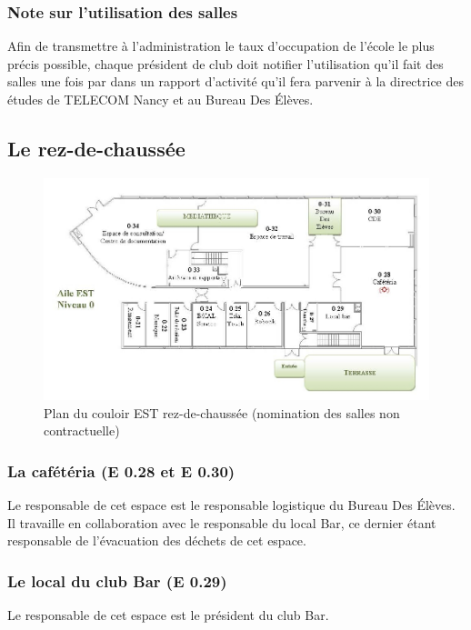 \documentclass{article} %
\begin{document}
			\subsubsection{Note sur l’utilisation des salles}

				Afin de transmettre à l’administration le taux d’occupation de
				l’école le plus précis possible, chaque président de club doit
				notifier l’utilisation qu’il fait des salles une fois par dans
				un rapport d'activité qu'il fera parvenir  à la directrice des
				études de TELECOM Nancy et au Bureau Des Élèves.

		\subsection{Le rez-de-chaussée}
		
		\begin{figure}[]
			\centering
			\includegraphics[width=0.8\linewidth]{images/aile_est}
			\caption{Plan du couloir EST rez-de-chaussée (nomination des salles
			non contractuelle)}
			\label{fig:plan}
		\end{figure}

			\subsubsection{La cafétéria (E 0.28 et E 0.30)}

				Le responsable de cet espace est le responsable logistique du
				Bureau Des Élèves. Il travaille en collaboration avec le
				responsable du local Bar, ce dernier étant responsable de
				l’évacuation des déchets de cet espace.

			\subsubsection{Le local du club Bar (E 0.29)}

				Le responsable de cet espace est le président du club Bar.
\end{document}
